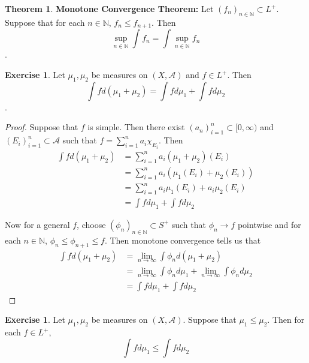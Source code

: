 \documentclass[12pt]{amsart}
\theoremstyle{definition}
\newtheorem{thm}[definition]{Theorem}
\newtheorem{ex}[definition]{Exercise}
\newcommand{\N}{\mathbb{N}}
\newcommand{\MA}{\mathcal{A}}
\newcommand{\Rg}{[0,\infty)}
\newcommand{\limn}{\lim \limits_{n \rightarrow \infty}}
\begin{document}
	\begin{thm}\textbf{Monotone Convergence Theorem:} 
		Let $(f_n)_{n \in \N} \subset L^+$. Suppose that for each $n \in \N$, $f_n \leq f_{n+1}$. Then $$\sup_{n \in \N} \int f_n = \int \sup_{n \in \N} f_n$$.
	\end{thm}
	
	\begin{ex}
		Let $\mu_1, \mu_2$ be measures on $(X, \MA)$ and $f \in L^+$. Then $$\int f d (\mu_1 + \mu_2) = \int f d\mu_1 + \int f d\mu_2$$.  
	\end{ex}
	
	\begin{proof}
		Suppose that $f$ is simple. Then there exist $(a_n)_{i=1}^n \subset \Rg$ and $(E_i)_{i=1}^n \subset \MA$ such that $f = \sum\limits_{i =1}^n a_i \chi_{E_i}$. Then 
		\begin{align*}
			\int f d(\mu_1 + \mu_2) 
			&= \sum\limits_{i =1}^n a_i (\mu_1 + \mu_2)(E_i)\\
			&= \sum\limits_{i =1}^n a_i (\mu_1(E_i) + \mu_2(E_i))\\
			&= \sum\limits_{i =1}^n a_i \mu_1(E_i) + a_i \mu_2(E_i)\\
			&= \int f d\mu_1 + \int f d\mu_2
		\end{align*}
		
		Now for a general $f$, choose $(\phi_n)_{n \in \N} \subset S^+$ such that $\phi_n \rightarrow f$ pointwise and for each $n \in \N$, $\phi_n \leq \phi_{n+1} \leq f$. Then monotone convergence tells us that 
		\begin{align*}
			\int f d(\mu_1 + \mu_2) 
			&= \limn \int \phi_n d(\mu_1 + \mu_2)\\
			&= \limn \int \phi_n d \mu_1 + \limn \int \phi_n d \mu_2 \\
			&= \int f d \mu_1 + \int f d \mu_2
		\end{align*}
		
	\end{proof}
	
	
	\begin{ex}
		Let $\mu_1, \mu_2$ be measures on $(X,\MA)$. Suppose that $\mu_1 \leq \mu_2$. Then for each $f \in L^+$, $$\int f d\mu_1 \leq \int f d\mu_2$$
	\end{ex}
	
\end{document}

